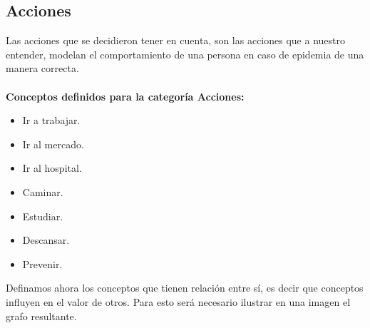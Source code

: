 \subsection{Acciones}
Las acciones que se decidieron tener en cuenta, son las acciones que a nuestro entender, modelan el 
comportamiento de una persona en caso de epidemia de una manera correcta.\\
\\
\textbf{Conceptos definidos para la categoría Acciones:}
\begin{itemize}
    \item Ir a trabajar.
    \item Ir al mercado.
    \item Ir al hospital.
    \item Caminar.
    \item Estudiar.
    \item Descansar.
    \item Prevenir.
\end{itemize}

Definamos ahora los conceptos que tienen relación entre sí, es decir que conceptos influyen en el valor de otros.
Para esto será necesario ilustrar en una imagen el grafo resultante.




